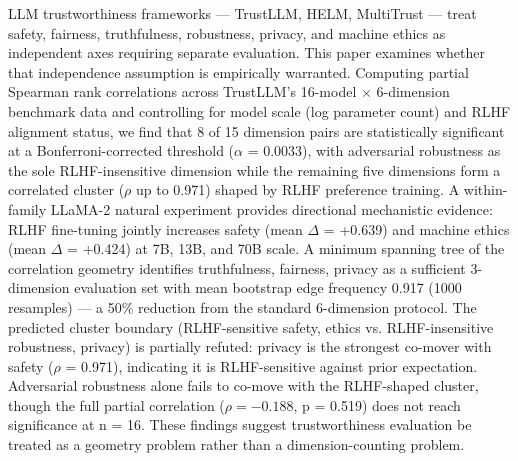 
LLM trustworthiness frameworks --- TrustLLM, HELM, MultiTrust --- treat safety, fairness, truthfulness, robustness, privacy, and machine ethics as independent axes requiring separate evaluation. This paper examines whether that independence assumption is empirically warranted. Computing partial Spearman rank correlations across TrustLLM's 16-model $\times$ 6-dimension benchmark data and controlling for model scale (log parameter count) and RLHF alignment status, we find that 8 of 15 dimension pairs are statistically significant at a Bonferroni-corrected threshold ($\alpha$ = 0.0033), with adversarial robustness as the sole RLHF-insensitive dimension while the remaining five dimensions form a correlated cluster ($\rho$ up to 0.971) shaped by RLHF preference training. A within-family LLaMA-2 natural experiment provides directional mechanistic evidence: RLHF fine-tuning jointly increases safety (mean $\Delta$ = +0.639) and machine ethics (mean $\Delta$ = +0.424) at 7B, 13B, and 70B scale. A minimum spanning tree of the correlation geometry identifies {truthfulness, fairness, privacy} as a sufficient 3-dimension evaluation set with mean bootstrap edge frequency 0.917 (1000 resamples) --- a 50\% reduction from the standard 6-dimension protocol. The predicted cluster boundary (RLHF-sensitive {safety, ethics} vs. RLHF-insensitive {robustness, privacy}) is partially refuted: privacy is the strongest co-mover with safety ($\rho$ = 0.971), indicating it is RLHF-sensitive against prior expectation. Adversarial robustness alone fails to co-move with the RLHF-shaped cluster, though the full partial correlation ($\rho = -0.188$, p = 0.519) does not reach significance at n = 16. These findings suggest trustworthiness evaluation be treated as a geometry problem rather than a dimension-counting problem.

